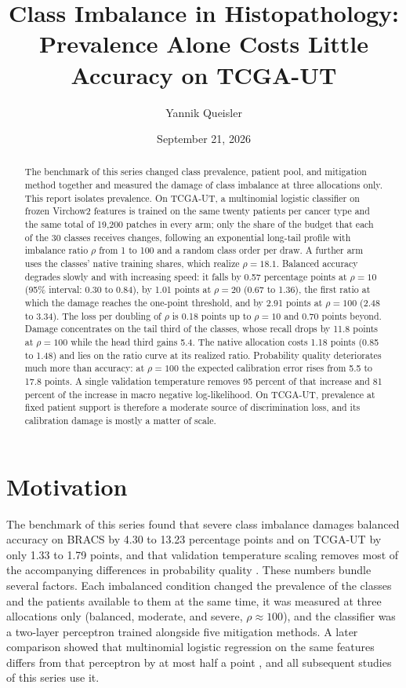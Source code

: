 \documentclass[11pt]{article}
\title{Class Imbalance in Histopathology:\\Prevalence Alone Costs Little Accuracy on TCGA-UT}
\author{Yannik Queisler}
\date{September 21, 2026}
\begin{document}
\raggedbottom
{}
\setlength{\emergencystretch}{2em}
\maketitle
\begin{abstract}
\noindent The benchmark of this series changed class prevalence, patient pool, and mitigation method together and measured the damage of class imbalance at three allocations only. This report isolates prevalence. On TCGA-UT, a multinomial logistic classifier on frozen Virchow2 features is trained on the same twenty patients per cancer type and the same total of 19,200 patches in every arm; only the share of the budget that each of the 30 classes receives changes, following an exponential long-tail profile with imbalance ratio $\rho$ from 1 to 100 and a random class order per draw. A further arm uses the classes' native training shares, which realize $\rho=18.1$. Balanced accuracy degrades slowly and with increasing speed: it falls by 0.57 percentage points at $\rho=10$ (95\% interval: 0.30 to 0.84), by 1.01 points at $\rho=20$ (0.67 to 1.36), the first ratio at which the damage reaches the one-point threshold, and by 2.91 points at $\rho=100$ (2.48 to 3.34). The loss per doubling of $\rho$ is 0.18 points up to $\rho=10$ and 0.70 points beyond. Damage concentrates on the tail third of the classes, whose recall drops by 11.8 points at $\rho=100$ while the head third gains 5.4. The native allocation costs 1.18 points (0.85 to 1.48) and lies on the ratio curve at its realized ratio. Probability quality deteriorates much more than accuracy: at $\rho=100$ the expected calibration error rises from 5.5 to 17.8 points. A single validation temperature removes 95 percent of that increase and 81 percent of the increase in macro negative log-likelihood. On TCGA-UT, prevalence at fixed patient support is therefore a moderate source of discrimination loss, and its calibration damage is mostly a matter of scale.
\end{abstract}

\section{Motivation}
\label{sec:motivation}
The benchmark of this series found that severe class imbalance damages balanced accuracy on BRACS by 4.30 to 13.23 percentage points and on TCGA-UT by only 1.33 to 1.79 points, and that validation temperature scaling removes most of the accompanying differences in probability quality \citep{queisler2026benchmarkResults,queisler2026benchmarkProtocol}. These numbers bundle several factors. Each imbalanced condition changed the prevalence of the classes and the patients available to them at the same time, it was measured at three allocations only (balanced, moderate, and severe, $\rho\approx100$), and the classifier was a two-layer perceptron trained alongside five mitigation methods. A later comparison showed that multinomial logistic regression on the same features differs from that perceptron by at most half a point \citep{queisler2026patientShortage}, and all subsequent studies of this series use it.
\end{document}
